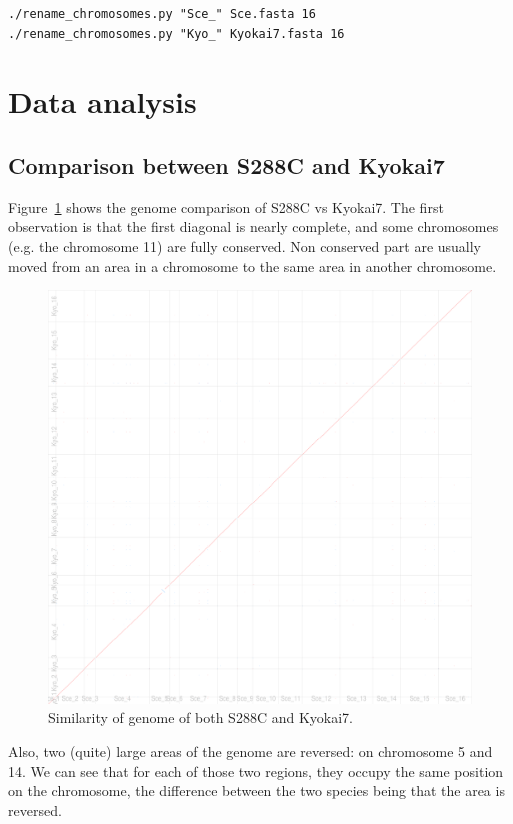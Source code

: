 \documentclass{article}
\begin{document}
\begin{verbatim}
./rename_chromosomes.py "Sce_" Sce.fasta 16
./rename_chromosomes.py "Kyo_" Kyokai7.fasta 16
\end{verbatim}

\section{Data analysis}
\subsection{Comparison between S288C and Kyokai7}

Figure~\ref{fig:Sce-Kyo} shows the genome comparison of S288C vs Kyokai7. The first observation is that the first
diagonal is nearly complete, and some chromosomes (e.g. the chromosome 11) are fully conserved. Non conserved part
are usually moved from an area in a chromosome to the same area in another chromosome.

\begin{figure}[!h]
	\hspace{-1cm}
	\includegraphics[width=1.1\textwidth]{figs/Sce_Kyokai7.eps}
	\caption{Similarity of genome of both S288C and Kyokai7.\label{fig:Sce-Kyo}}
\end{figure}

Also, two (quite) large areas of the genome are reversed: on chromosome 5 and 14. We can see that for each of
those two regions, they occupy the same position on the chromosome, the difference between the two species being that
the area is reversed.
\end{document}
